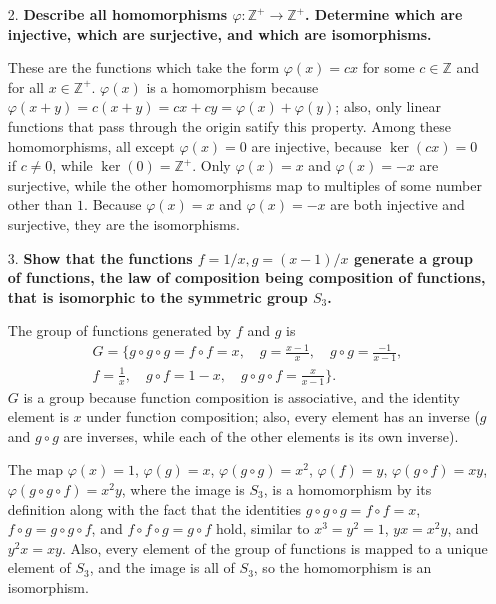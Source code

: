 \documentclass[a4paper,12pt]{article}
\begin{document}
\begin{enumerate}
    \item[2.]
        \boldmath
        \textbf{Describe all homomorphisms $\varphi : \mathbb{Z}^+ \to \mathbb{Z}^+$. Determine which are injective, which are surjective, and which are isomorphisms.} \par
        \unboldmath
        These are the functions which take the form $\varphi(x) = cx$ for some $c \in \mathbb{Z}$ and for all $x \in \mathbb{Z}^+$. $\varphi(x)$ is a homomorphism because $\varphi(x + y) = c(x + y) = cx + cy = \varphi(x) + \varphi(y)$; also, only linear functions that pass through the origin satify this property. Among these homomorphisms, all except $\varphi(x) = 0$ are injective, because $\ker(cx) = 0$ if $c \neq 0$, while $\ker(0) = \mathbb{Z}^+$. Only $\varphi(x) = x$ and $\varphi(x) = -x$ are surjective, while the other homomorphisms map to multiples of some number other than $1$. Because $\varphi(x) = x$ and $\varphi(x) = -x$ are both injective and surjective, they are the isomorphisms.

    \item[3.]
        \boldmath
        \textbf{Show that the functions $f = 1/x, g = (x - 1)/x$ generate a group of functions, the law of composition being composition of functions, that is isomorphic to the symmetric group $S_3$.} \par
        \unboldmath
        The group of functions generated by $f$ and $g$ is
        \begin{align*}
            G = \{ g \circ g \circ g = f \circ f = x, \quad g = \frac{x - 1}{x}, \quad g \circ g = \frac{-1}{x - 1}, \\
            f = \frac{1}{x}, \quad g \circ f = 1 - x, \quad g \circ g \circ f = \frac{x}{x - 1} \}.
        \end{align*}
        $G$ is a group because function composition is associative, and the identity element is $x$ under function composition; also, every element has an inverse ($g$ and $g \circ g$ are inverses, while each of the other elements is its own inverse). \par
        The map $\varphi(x) = 1$, $\varphi(g) = x$, $\varphi(g \circ g) = x^2$, $\varphi(f) = y$, $\varphi(g \circ f) = xy$, $\varphi(g \circ g \circ f) = x^2 y$, where the image is $S_3$, is a homomorphism by its definition along with the fact that the identities $g \circ g \circ g = f \circ f = x$, $f \circ g = g \circ g \circ f$, and $f \circ f \circ g = g \circ f$ hold, similar to $x^3 = y^2 = 1$, $yx = x^2y$, and $y^2x = xy$. Also, every element of the group of functions is mapped to a unique element of $S_3$, and the image is all of $S_3$, so the homomorphism is an isomorphism.


\end{enumerate}
\end{document}
